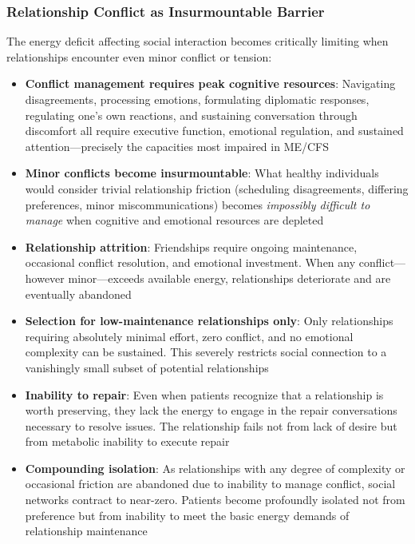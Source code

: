 \subsubsection{Relationship Conflict as Insurmountable Barrier}

The energy deficit affecting social interaction becomes critically limiting when relationships encounter even minor conflict or tension:

\begin{itemize}
    \item \textbf{Conflict management requires peak cognitive resources}: Navigating disagreements, processing emotions, formulating diplomatic responses, regulating one's own reactions, and sustaining conversation through discomfort all require executive function, emotional regulation, and sustained attention---precisely the capacities most impaired in ME/CFS

    \item \textbf{Minor conflicts become insurmountable}: What healthy individuals would consider trivial relationship friction (scheduling disagreements, differing preferences, minor miscommunications) becomes \textit{impossibly difficult to manage} when cognitive and emotional resources are depleted

    \item \textbf{Relationship attrition}: Friendships require ongoing maintenance, occasional conflict resolution, and emotional investment. When any conflict---however minor---exceeds available energy, relationships deteriorate and are eventually abandoned

    \item \textbf{Selection for low-maintenance relationships only}: Only relationships requiring absolutely minimal effort, zero conflict, and no emotional complexity can be sustained. This severely restricts social connection to a vanishingly small subset of potential relationships

    \item \textbf{Inability to repair}: Even when patients recognize that a relationship is worth preserving, they lack the energy to engage in the repair conversations necessary to resolve issues. The relationship fails not from lack of desire but from metabolic inability to execute repair

    \item \textbf{Compounding isolation}: As relationships with any degree of complexity or occasional friction are abandoned due to inability to manage conflict, social networks contract to near-zero. Patients become profoundly isolated not from preference but from inability to meet the basic energy demands of relationship maintenance


\end{itemize}
